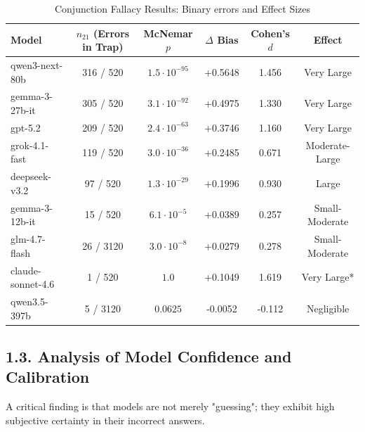 \begin{table}[h!]
\centering
\caption{Conjunction Fallacy Results: Binary errors and Effect Sizes}
\label{tab:linda_full_data}
\begin{tabular}{lccccc}
\toprule
\textbf{Model} & \textbf{$n_{21}$ (Errors in Trap)} & \textbf{McNemar $p$} & \textbf{$\Delta$ Bias} & \textbf{Cohen's $d$} & \textbf{Effect} \\ 
\midrule
qwen3-next-80b     & 316 / 520 & $1.5 \cdot 10^{-95}$ & +0.5648 & 1.456 & Very Large \\
gemma-3-27b-it     & 305 / 520 & $3.1 \cdot 10^{-92}$ & +0.4975 & 1.330 & Very Large \\
gpt-5.2            & 209 / 520 & $2.4 \cdot 10^{-63}$ & +0.3746 & 1.160 & Very Large \\
grok-4.1-fast      & 119 / 520 & $3.0 \cdot 10^{-36}$ & +0.2485 & 0.671 & Moderate-Large \\
deepseek-v3.2      & 97 / 520  & $1.3 \cdot 10^{-29}$ & +0.1996 & 0.930 & Large \\
gemma-3-12b-it     & 15 / 520  & $6.1 \cdot 10^{-5}$  & +0.0389 & 0.257 & Small-Moderate \\
glm-4.7-flash      & 26 / 3120 & $3.0 \cdot 10^{-8}$  & +0.0279 & 0.278 & Small-Moderate \\
claude-sonnet-4.6  & 1 / 520   & $1.0$                & +0.1049 & 1.619 & Very Large* \\
qwen3.5-397b       & 5 / 3120  & $0.0625$             & -0.0052 & -0.112 & Negligible \\
\bottomrule
\end{tabular}
\end{table}

\subsection*{1.3. Analysis of Model Confidence and Calibration}
A critical finding is that models are not merely "guessing"; they exhibit high subjective certainty in their incorrect answers. 

